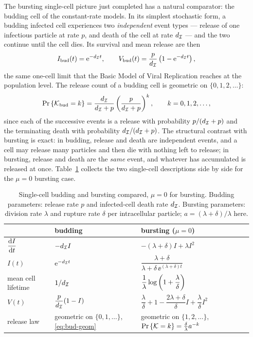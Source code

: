 The bursting single-cell picture just completed has a natural comparator:
the budding cell of the constant-rate models. In its simplest stochastic
form, a budding infected cell experiences two \textit{independent} event
types --- release of one infectious particle at rate $p$, and death of the
cell at rate $d_{\mathcal{I}}$ --- and the two continue until the cell dies. Its
survival and mean release are then
$$I_{\rm bud}(t)={\rm e}^{-d_{\mathcal{I}}t},\qquad
V_{\rm bud}(t)=\frac{p}{d_{\mathcal{I}}}\left(1-{\rm e}^{-d_{\mathcal{I}}t}\right),$$
the same one-cell limit that the Basic Model of Viral Replication reaches at
the population level. The release count of a budding cell is geometric on
$\{0,1,2,\ldots\}$:
\begin{equation}
{\text{Pr}\left\{\mathcal{K}_{\rm bud}=k\right\}}=\frac{d_{\mathcal{I}}}{d_{\mathcal{I}}+p}
\left(\frac{p}{d_{\mathcal{I}}+p}\right)^k,\qquad k=0,1,2,\ldots,
\label{eq:bud-geom}
\end{equation}
since each of the successive events is a release with probability
$p/(d_{\mathcal{I}}+p)$ and the terminating death with probability
$d_{\mathcal{I}}/(d_{\mathcal{I}}+p)$. The structural contrast with bursting is exact:
in budding, release and death are independent events, and a cell may release
many particles and then die with nothing left to release; in bursting,
release and death are the \textit{same} event, and whatever has accumulated
is released at once. Table~\ref{tab:budburst} collects the two single-cell
descriptions side by side for the $\mu=0$ bursting case.

\begin{table}[H]
\centering
\renewcommand{\arraystretch}{1.4}
\small
\begin{tabular}{@{}lll@{}}
\toprule
 & budding & bursting ($\mu=0$) \\
\midrule
$\displaystyle\frac{{\rm d} I}{{\rm d} t}$ & $-d_{\mathcal{I}} I$ & $-(\lambda+\delta)I+\lambda I^2$ \\
$I(t)$ & ${\rm e}^{-d_{\mathcal{I}}t}$ & $\dfrac{\lambda+\delta}{\lambda+\delta\,\ee^{(\lambda+\delta)t}}$ \\
mean cell lifetime & $1/d_{\mathcal{I}}$ & $\dfrac{1}{\lambda}\log\left(1+\dfrac{\lambda}{\delta}\right)$ \\
$V(t)$ & $\dfrac{p}{d_{\mathcal{I}}}(1-I)$ & $\dfrac{\lambda}{\delta}+1-\dfrac{2\lambda+\delta}{\delta}I+\dfrac{\lambda}{\delta}I^2$ \\
release law & geometric on $\{0,1,\ldots\}$, \eqref{eq:bud-geom} & geometric on $\{1,2,\ldots\}$, ${\text{Pr}\left\{\mathcal{K}=k\right\}}=\frac{\delta}{\lambda}a^{-k}$ \\
\bottomrule
\end{tabular}
\caption{Single-cell budding and bursting compared, $\mu=0$ for bursting.
Budding parameters: release rate $p$ and infected-cell death rate
$d_{\mathcal{I}}$. Bursting parameters: division rate $\lambda$ and rupture rate
$\delta$ per intracellular particle; $a=(\lambda+\delta)/\lambda$ here.}
\label{tab:budburst}
\end{table}

